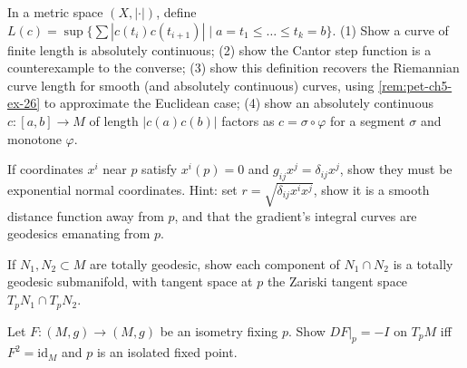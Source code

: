 \begin{remark}
  \label{rem:pet-ch5-ex-29}
  In a metric space $(X,|\cdot|)$, define
  $L(c)=\sup\{\sum|c(t_i)c(t_{i+1})|\mid a=t_1\le\dots\le t_k=b\}$. (1) Show a
  curve of finite length is absolutely continuous; (2) show the Cantor step
  function is a counterexample to the converse; (3) show this definition recovers
  the Riemannian curve length for smooth (and absolutely continuous) curves, using
  \cref{rem:pet-ch5-ex-26} to approximate the Euclidean case; (4) show an
  absolutely continuous $c:[a,b]\to M$ of length $|c(a)c(b)|$ factors as
  $c=\sigma\circ\varphi$ for a segment $\sigma$ and monotone $\varphi$.
\end{remark}

\begin{remark}
  \label{rem:pet-ch5-ex-30}
  If coordinates $x^i$ near $p$ satisfy $x^i(p)=0$ and $g_{ij}x^j=\delta_{ij}x^j$,
  show they must be exponential normal coordinates. Hint: set
  $r=\sqrt{\delta_{ij}x^ix^j}$, show it is a smooth distance function away from
  $p$, and that the gradient's integral curves are geodesics emanating from $p$.
\end{remark}

\begin{remark}
  \label{rem:pet-ch5-ex-31}
  If $N_1,N_2\subset M$ are totally geodesic, show each component of $N_1\cap N_2$
  is a totally geodesic submanifold, with tangent space at $p$ the Zariski tangent
  space $T_pN_1\cap T_pN_2$.
\end{remark}

\begin{remark}
  \label{rem:pet-ch5-ex-32}
  Let $F:(M,g)\to(M,g)$ be an isometry fixing $p$. Show $DF|_p=-I$ on $T_pM$ iff
  $F^2=\mathrm{id}_M$ and $p$ is an isolated fixed point.
\end{remark}

